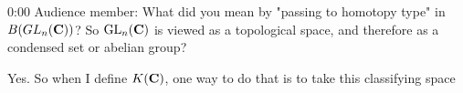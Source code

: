 \begin{unfinished}{0:00}
Audience member: What did you mean by "passing to homotopy type" in $B(GL_n(\mathbf C))$? So $\operatorname{GL}_n(\mathbf C)$ is viewed as a topological space, and therefore as a condensed set or abelian group?

Yes. So when I define $K(\mathbf C)$, one way to do that is to take this classifying space
\end{unfinished}